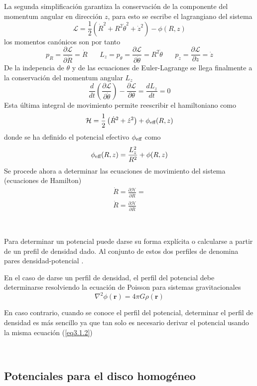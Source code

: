 \documentclass[10pt]{article}
\newcommand{\sub}[1]{\mbox{\scriptsize{#1}}}
\newcommand{\der}[2]{ \frac{ \partial #1 }{\partial #2} }
\newcommand{\dtot}[2]{ \frac{ d #1 }{d #2} }
\newcommand{\pr}[1]{ \left( #1 \right) }
\newcommand{\eq}[2]{\begin{equation} \label{eq#1} #2 \end{equation}}
\newcommand{\bds}[1]{\boldsymbol{ #1 }}
\begin{document}
La segunda simplificación garantiza la conservación de la componente del momentum angular en dirección $z$, para esto se escribe el lagrangiano del sistema 
\[ \mathcal L = \frac{1}{2}\pr{\dot R^2 + R^2 \dot \theta^2 + \dot z^2} - \phi(R,z) \]
los momentos canónicos son por tanto
\[ p_R = \der{\mathcal L}{\dot R} = \dot R\ \ \ \ \ \ \ \ L_z = p_\theta = \der{\mathcal L}{\dot \theta} =  R^2 \dot\theta\ \ \ \ \ \ \ \ p_z = \der{\mathcal L}{\dot z} = \dot z \]
De la indepencia de $\theta$ y de las ecuaciones de Euler-Lagrange se llega finalmente a la conservación del momentum angular $L_z$
\[ \dtot{ }{ t }\pr{ \der{\mathcal L}{\dot \theta} } - \der{\mathcal L}{\theta} =  \dtot{ L_z }{ t } = 0 \]
Esta última integral de movimiento permite reescribir el hamiltoniano como
\eq{3.1.2}
{ \mathcal H = \frac{1}{2}\pr{\dot R^2 + \dot z^2} + \phi_{\sub{eff}}(R,z) }
donde se ha definido el potencial efectivo $\phi_{\sub{eff}}$ como
\eq{3.1.3}
{ \phi_{\sub{eff}}(R,z) = \frac{L_z^2}{R^2} + \phi(R,z) }
Se procede ahora a determinar las ecuaciones de movimiento del sistema (ecuaciones de Hamilton) \cite{Goldstein89}
\begin{eqnarray}
\label{eq3.1.2}
\dot R = \der{\mathcal H}{\dot R} =   \\
\label{eq3.1.3}
\dot R = \der{\mathcal H}{\dot R}
\end{eqnarray}


\

Para determinar un potencial puede darse su forma explícita o calcularse a partir de un prefil de densidad dado. Al conjunto de estos dos perfiles de denomina pares densidad-potencial \cite{Binney87}.


En el caso de darse un perfil de densidad, el perfil del potencial debe determinarse resolviendo la ecuación de Poisson para sistemas gravitacionales
\eq{3.1.2}
{ \nabla^2 \phi(\bds r) = 4\pi G \rho(\bds r)  }

En caso contrario, cuando se conoce el perfil del potencial, determinar el perfil de densidad es más sencillo ya que tan solo es necesario derivar el potencial usando la misma ecuación (\ref{eq3.1.2})

\



\subsection{Potenciales para el disco homogéneo}

\end{document}
